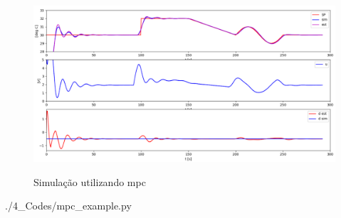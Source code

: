 \begin{figure}[h]
    \caption{Simulação utilizando \acrlong{mpc}}
	\begin{center}
		\includegraphics[width=1\textwidth]{./5_images/fig_mpc_example.png} 
		\label{fig:mpc_example}
	\end{center}
    \centering
\end{figure}


    {./4_Codes/mpc_example.py}
    \begin{center}
    \end{center}
